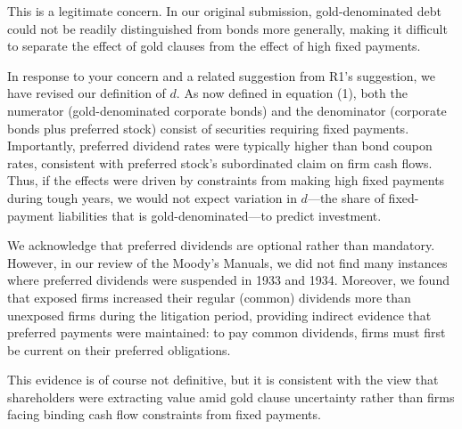\bigskip

\noindent This is a legitimate concern. In our original submission, gold-denominated debt could not be readily distinguished from bonds more generally, making it difficult to separate the effect of gold clauses from the effect of high fixed payments.

In response to your concern and a related suggestion from R1's suggestion, we have revised our definition of $d$. As now defined in equation (1), both the numerator (gold-denominated corporate bonds) and the denominator (corporate bonds plus preferred stock) consist of securities requiring fixed payments. Importantly, preferred dividend rates were typically higher than bond coupon rates, consistent with preferred stock's subordinated claim on firm cash flows. Thus, if the effects were driven by constraints from making high fixed payments during tough years, we would not expect variation in $d$---the share of fixed-payment liabilities that is gold-denominated---to predict investment.

We acknowledge that preferred dividends are optional rather than mandatory. However, in our review of the Moody's Manuals, we did not find many instances where preferred dividends were suspended in 1933 and 1934. Moreover, we found that exposed firms increased their regular (common) dividends more than unexposed firms during the litigation period, providing indirect evidence that preferred payments were maintained: to pay common dividends, firms must first be current on their preferred obligations. 

This evidence is of course not definitive, but it is consistent with the view that shareholders were extracting value amid gold clause uncertainty rather than firms facing binding cash flow constraints from fixed payments.
